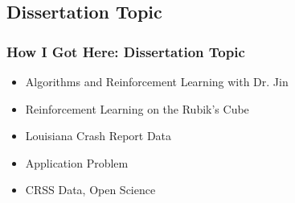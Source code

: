 \subsection{Dissertation Topic}

\begin{frame}[t]
	\frametitle{How I Got Here:  Dissertation Topic}
\Large

	\begin{itemize}
		\item Algorithms and Reinforcement Learning with Dr. Jin %
		\item Reinforcement Learning on the Rubik's Cube 
		\item Louisiana Crash Report Data 
		\item Application Problem
		\item CRSS Data, Open Science %
	\end{itemize}

\end{frame}



